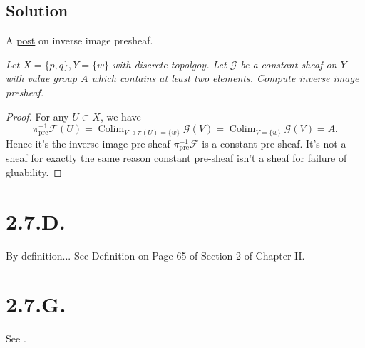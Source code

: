 \subsection{Solution}

A \href{https://math.stackexchange.com/questions/439769/inverse-image-presheaf}{post} on inverse image presheaf.

\textit{Let $X=\{p,q\}, Y=\{w\}$ with discrete topolgoy. Let $\mathscr G$ be a constant sheaf on $Y$ with value group $A$ which contains at least two elements. Compute inverse image presheaf.}
\begin{proof}
	For any $U\subset X$, we have 
	\[\pi_{\text{pre}}^{-1}\mathscr F(U)=\operatorname{Colim}_{V\supset \pi(U)=\{w\}}\mathscr G(V)=\operatorname{Colim}_{V=\{w\}}\mathscr G(V)=A.\]
	Hence it's the inverse image pre-sheaf $\pi_{\text{pre}}^{-1}\mathscr F$ is a constant pre-sheaf. It's not a sheaf for exactly the same reason constant pre-sheaf isn't a sheaf for failure of gluability.
\end{proof}

\section{2.7.D.}\label{2.7.D.}

By definition... See \cite{hartshorne2013algebraic} Definition on Page 65 of Section 2 of Chapter II.

\section{2.7.G.}

See .